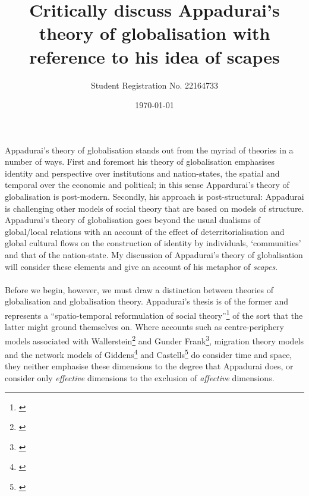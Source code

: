 \documentclass{article}
\title{Critically discuss Appadurai's theory of globalisation with reference to his idea of scapes}
\author{Student Registration No. 22164733}
\date{\today}
\begin{document}

\maketitle
\doublespacing
\paragraph{}Appadurai's theory of globalisation stands out from the myriad of theories in a number of ways. First and foremost his theory of globalisation emphasises identity and perspective over institutions and nation-states, the spatial and temporal over the economic and political; in this sense Appardurai's theory of globalisation is post-modern. Secondly, his approach is post-structural: Appadurai is challenging other models of social theory that are based on models of structure. Appadurai's theory of globalisation goes beyond the usual dualisms of global/local relations with an account of the effect of deterritorialisation and global cultural flows on the construction of identity by individuals, `communities' and that of the nation-state. My discussion of Appadurai's theory of globalisation will consider these elements and give an account of his metaphor of \emph{scapes}.

\paragraph{}Before we begin, however, we must draw a distinction between theories of globalisation and globalisation theory. Appadurai's thesis is of the former and represents a ``spatio-temporal reformulation of social theory''\footnote{\cite[p.4]{Rosenberg:2000fg}} of the sort that the latter might ground themselves on. Where accounts such as centre-periphery models associated with Wallerstein\footnote{\cite{Wallerstein:1979cw,worsley:1990ow}} and Gunder Frank\footnote{\cite{Frank:1975du}}, migration theory models and the network models of  Giddens\footnote{\cite{Giddens:1990cm}} and Castells\footnote{\cite{Castells:1996ns}} do consider time and space, they neither emphasise these dimensions to the degree that Appadurai does, or consider only \emph{effective} dimensions to the exclusion of \emph{affective} dimensions.
\end{document}

